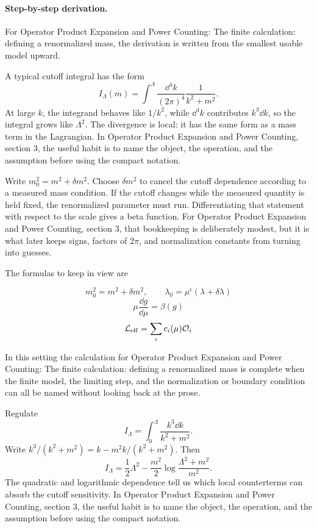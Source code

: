 \paragraph{Step-by-step derivation.}

For Operator Product Expansion and Power Counting: The finite calculation: defining a renormalized mass, the derivation is written from the smallest usable model upward.

A typical cutoff integral has the form
\[
  I_\Lambda(m)=\int^{\Lambda}\frac{\dd^4k}{(2\pi)^4}\frac{1}{k^2+m^2}.
\]
At large \(k\), the integrand behaves like \(1/k^2\), while \(\dd^4k\) contributes \(k^3\dd k\), so the integral grows like \(\Lambda^2\).  The divergence is local: it has the same form as a mass term in the Lagrangian.  In Operator Product Expansion and Power Counting, section 3, the useful habit is to name the object, the operation, and the assumption before using the compact notation.

Write \(m_0^2=m^2+\delta m^2\).  Choose \(\delta m^2\) to cancel the cutoff dependence according to a measured mass condition.  If the cutoff changes while the measured quantity is held fixed, the renormalized parameter must run.  Differentiating that statement with respect to the scale gives a beta function.  For Operator Product Expansion and Power Counting, section 3, that bookkeeping is deliberately modest, but it is what later keeps signs, factors of \(2\pi\), and normalization constants from turning into guesses.

The formulas to keep in view are

\[
  m_0^2=m^2+\delta m^2,\qquad \lambda_0=\mu^\epsilon(\lambda+\delta\lambda)
\]
\[
  \mu\frac{\dd g}{\dd\mu}=\beta(g)
\]
\[
  \mathcal L_{\mathrm{eff}}=\sum_i c_i(\mu)\mathcal O_i
\]

In this setting the calculation for Operator Product Expansion and Power Counting: The finite calculation: defining a renormalized mass is complete when the finite model, the limiting step, and the normalization or boundary condition can all be named without looking back at the prose.




\begin{example}
Regulate
\[
  I_\Lambda=\int_0^\Lambda\frac{k^3\dd k}{k^2+m^2}.
\]
Write \(k^3/(k^2+m^2)=k-m^2k/(k^2+m^2)\).  Then
\[
  I_\Lambda=\frac12\Lambda^2-\frac{m^2}{2}\log\frac{\Lambda^2+m^2}{m^2}.
\]
The quadratic and logarithmic dependence tell us which local counterterms can absorb the cutoff sensitivity.  In Operator Product Expansion and Power Counting, section 3, the useful habit is to name the object, the operation, and the assumption before using the compact notation.
\end{example}



